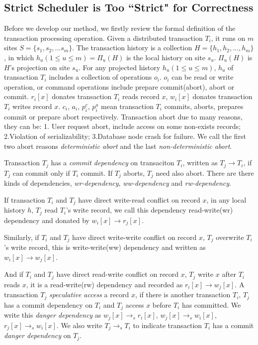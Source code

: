 \documentclass[conference]{IEEEtran}
\begin{document}
\subsection{Strict Scheduler is Too ``Strict" for Correctness}

Before we develop our method, we firstly review the formal definition of the transaction processing operation.
Given a distributed transaction ${T_i}$,  it runs on ${m}$ sites  ${S = \{s_1, s_2, ... s_m\}}$.
The transaction history is a collection ${H = \{h_1, h_2, ..., h_m\}}$,
in which ${h_u (1 \le u \le m) = \Pi_u(H)}$ is the local history on site ${s_u}$.
${\Pi_u(H)}$ is ${H}$'s projection on site ${s_u}$.
For any projected history ${h_u(1 \le u \le m)}$, ${h_{u} }$ of transaction ${T_i}$ includes a collection of operations $o_i$.
$o_i$ can be read or write operation, or command operations include prepare commit(abort), abort or commit.
${r_i[x]}$ donates transaction ${T_i}$ reads record ${x}$,  ${w_i[x]}$ donates transaction ${T_i}$ writes record ${x}$.
${c_i}$, ${a_i}$, ${p^c_i}$, ${p^a_i}$ mean transaction ${T_i}$ commits, aborts, prepares commit or prepare abort respectively.
Transaction abort due to many reasons, they can be:
1. User request abort, include access on some non-exists records;
2.Violation of serializability;
3.Database node crash for failure.
We call the first two abort reasons \emph{deterministic abort} and the last \emph{non-deterministic abort}.

Transaction ${T_j}$ has a \emph{commit dependency} on transaciton ${T_i}$, written as ${T_j \rightarrow T_i}$, if ${T_j}$ can commit only if ${T_i}$ commit. 
If ${T_j}$ aborts, ${T_j}$ need also abort.
There are there kinds of dependencies, \emph{wr-dependency}, \emph{ww-dependency} and \emph{rw-dependency}.

If transaction ${T_i}$ and ${T_j}$ have direct write-read conflict on record ${x}$, in any local history ${h}$, ${T_j}$ read ${T_i}$'s write record,
we call this dependency read-write(wr) dependency and donated by ${w_i[x] \rightarrow r_j[x]}$.

Similarly, if ${T_i}$ and ${T_j}$ have direct write-write conflict on record ${x}$, ${T_j}$ overwrite ${T_i}$'s write record, this is  write-write(ww) dependency and written as ${w_i[x] \rightarrow w_j[x]}$.

And if ${T_i}$ and ${T_j}$ have direct read-write conflict on record ${x}$, ${T_j}$ write ${x}$ after ${T_i}$ reads ${x}$, it is a read-write(rw) dependency and recorded as ${r_i[x] \rightarrow w_j[x]}$. 
A transaction ${T_j}$ \emph{speculative access} a record ${x}$, if there is another transaction ${T_i}$, 
${T_j}$ has a commit dependency on ${T_i}$ and ${T_j}$ access ${x}$ before ${T_i}$ has committed.
We write this \emph{danger dependency} as ${w_j[x] \rightarrow_s r_i[x]}$, ${w_j[x] \rightarrow_s w_i[x]}$, 
${r_j[x] \rightarrow_s w_i[x]}$.
We also write ${T_j \rightarrow_s T_i}$ to indicate transaction ${T_i}$ has a commit \emph{danger dependency} on ${T_j}$. 
\end{document}
